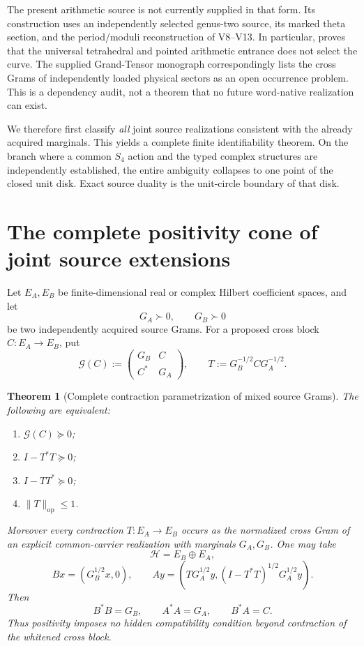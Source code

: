 \documentclass[11pt]{article}
\newtheorem{theorem}{Theorem}[section]
\theoremstyle{definition}
\theoremstyle{remark}
\newcommand{\op}{\mathrm{op}}
\newcommand{\norm}[1]{\lVert#1\rVert}
\begin{document}
The present arithmetic source is not currently supplied in that form.  Its
construction uses an independently selected genus-two source, its marked theta
section, and the period/moduli reconstruction of V8--V13.  In particular,
 proves that the universal tetrahedral and pointed
arithmetic entrance does not select the curve.  The supplied Grand-Tensor
monograph correspondingly lists the cross Grams of independently loaded
physical sectors as an open occurrence problem.  This is a dependency audit,
not a theorem that no future word-native realization can exist.

We therefore first classify \emph{all} joint source realizations consistent
with the already acquired marginals.  This yields a complete finite
identifiability theorem.  On the branch where a common $S_4$ action and the
typed complex structures are independently established, the entire ambiguity
collapses to one point of the closed unit disk.  Exact source duality is the
unit-circle boundary of that disk.

\section{The complete positivity cone of joint source extensions}
\label{sec:v15-contraction-cone}

Let $E_A,E_B$ be finite-dimensional real or complex Hilbert coefficient
spaces, and let
\[
 G_A\succ0,\qquad G_B\succ0
\]
be two independently acquired source Grams.  For a proposed cross block
$C:E_A\to E_B$, put
\begin{equation}
 \mathcal G(C)
 :=\begin{pmatrix}G_B&C\\ C^*&G_A\end{pmatrix},
 \qquad
 T:=G_B^{-1/2}CG_A^{-1/2}.
 \label{eq:v15-block-gram}
\end{equation}

\begin{theorem}[Complete contraction parametrization of mixed source Grams]
\label{thm:v15-contraction-param}
The following are equivalent:
\begin{enumerate}[label=\textup{(\roman*)},leftmargin=2.8em]
\item $\mathcal G(C)\succeq0$;
\item $I-T^*T\succeq0$;
\item $I-TT^*\succeq0$;
\item $\norm{T}_{\op}\le1$.
\end{enumerate}
Moreover every contraction $T:E_A\to E_B$ occurs as the normalized cross
Gram of an explicit common-carrier realization with marginals $G_A,G_B$.
One may take
\[
 \mathcal H=E_B\oplus E_A,
\]
\begin{equation}
 Bx=(G_B^{1/2}x,0),
 \qquad
 Ay=\left(TG_A^{1/2}y,
 (I-T^*T)^{1/2}G_A^{1/2}y\right).
 \label{eq:v15-universal-realization}
\end{equation}
Then
\[
 B^*B=G_B,\qquad A^*A=G_A,\qquad B^*A=C.
\]
Thus positivity imposes no hidden compatibility condition beyond contraction
of the whitened cross block.
\end{theorem}
\end{document}
